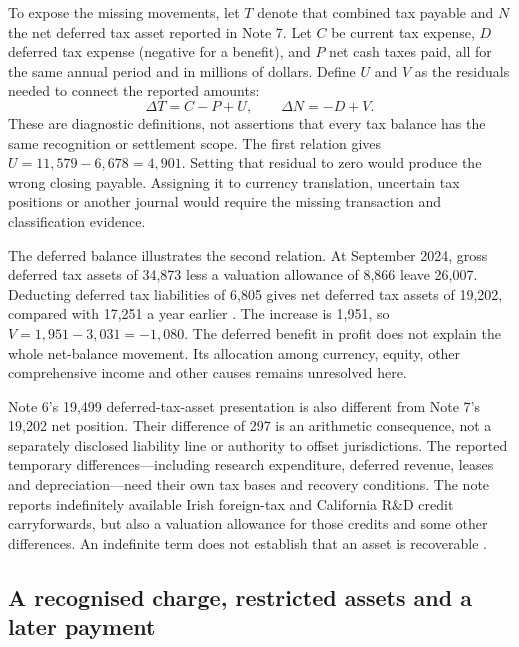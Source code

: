 To expose the missing movements, let $T$ denote that combined tax payable and
$N$ the net deferred tax asset reported in Note 7. Let $C$ be current tax
expense, $D$ deferred tax expense (negative for a benefit), and $P$ net cash
taxes paid, all for the same annual period and in millions of dollars. Define
$U$ and $V$ as the residuals needed to connect the reported amounts:
\begin{equation}
 \Delta T=C-P+U,\qquad \Delta N=-D+V.
 \label{eq:apple-tax-bridges}
\end{equation}
These are diagnostic definitions, not assertions that every tax balance has
the same recognition or settlement scope. The first relation gives
$U=11{,}579-6{,}678=4{,}901$. Setting that residual to zero would produce the
wrong closing payable. Assigning it to currency translation, uncertain tax
positions or another journal would require the missing transaction and
classification evidence.

The deferred balance illustrates the second relation. At September 2024,
gross deferred tax assets of 34,873 less a valuation allowance of 8,866 leave
26,007. Deducting deferred tax liabilities of 6,805 gives net deferred tax
assets of 19,202, compared with 17,251 a year earlier
\citep[Note 7, printed p.~41]{apple2024}. The increase is 1,951, so
$V=1{,}951-3{,}031=-1{,}080$. The deferred benefit in profit does not explain
the whole net-balance movement. Its allocation among currency, equity, other
comprehensive income and other causes remains unresolved here.

Note 6's 19,499 deferred-tax-asset presentation is also different from Note 7's
19,202 net position. Their difference of 297 is an arithmetic consequence,
not a separately disclosed liability line or authority to offset jurisdictions.
The reported temporary differences---including research expenditure, deferred
revenue, leases and depreciation---need their own tax bases and recovery
conditions. The note reports indefinitely available Irish foreign-tax and
California R\&D credit carryforwards, but also a valuation allowance for those
credits and some other differences. An indefinite term does not establish that
an asset is recoverable \citep[Notes 6--7, printed pp.~39--41]{apple2024}.

\subsection{A recognised charge, restricted assets and a later payment}

